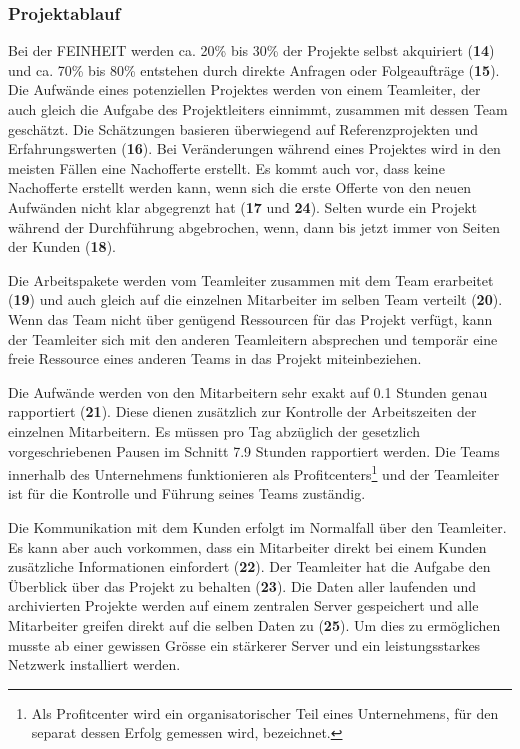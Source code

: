 \subsubsection{Projektablauf}
Bei der FEINHEIT werden ca. 20\% bis 30\% der Projekte selbst akquiriert (\textbf{14})
und ca. 70\% bis 80\% entstehen durch direkte Anfragen oder Folgeaufträge (\textbf{15}).
Die Aufwände eines potenziellen Projektes werden von einem Teamleiter, der auch
gleich die Aufgabe des Projektleiters einnimmt, zusammen mit dessen Team geschätzt.
Die Schätzungen basieren überwiegend auf Referenzprojekten und Erfahrungswerten (\textbf{16}).
Bei Veränderungen während eines Projektes wird in den meisten Fällen eine Nachofferte
erstellt. Es kommt auch vor, dass keine Nachofferte erstellt werden kann, wenn 
sich die erste Offerte von den neuen Aufwänden nicht klar abgegrenzt hat (\textbf{17} und \textbf{24}).
Selten wurde ein Projekt während der Durchführung abgebrochen, wenn, dann bis
jetzt immer von Seiten der Kunden (\textbf{18}).

Die Arbeitspakete werden vom Teamleiter zusammen mit dem Team erarbeitet (\textbf{19})
und auch gleich auf die einzelnen Mitarbeiter im selben Team verteilt (\textbf{20}).
Wenn das Team nicht über genügend Ressourcen für das Projekt verfügt, kann der
Teamleiter sich mit den anderen Teamleitern absprechen und temporär eine freie
Ressource eines anderen Teams in das Projekt miteinbeziehen.

Die Aufwände werden von den Mitarbeitern sehr exakt auf 0.1 Stunden genau 
rapportiert (\textbf{21}). Diese dienen zusätzlich zur Kontrolle der Arbeitszeiten
der einzelnen Mitarbeitern. Es müssen pro Tag abzüglich der gesetzlich 
vorgeschriebenen Pausen im Schnitt 7.9 Stunden rapportiert werden. Die Teams
innerhalb des Unternehmens funktionieren als Profitcenters\footnote{Als Profitcenter
wird ein organisatorischer Teil eines Unternehmens, für den separat dessen Erfolg
gemessen wird, bezeichnet.} und der Teamleiter ist für die Kontrolle und Führung 
seines Teams zuständig.

Die Kommunikation mit dem Kunden erfolgt im Normalfall über den Teamleiter. Es
kann aber auch vorkommen, dass ein Mitarbeiter direkt bei einem Kunden zusätzliche
Informationen einfordert (\textbf{22}). Der Teamleiter hat die Aufgabe den 
Überblick über das Projekt zu behalten (\textbf{23}). Die Daten aller laufenden
und archivierten Projekte werden auf einem zentralen Server gespeichert und alle
Mitarbeiter greifen direkt auf die selben Daten zu (\textbf{25}). Um dies zu 
ermöglichen musste ab einer gewissen Grösse ein stärkerer Server und ein 
leistungsstarkes Netzwerk installiert werden.

